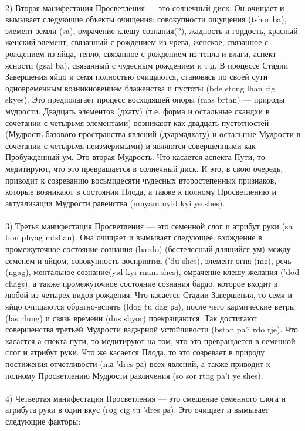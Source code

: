 \\
2) Вторая манифестация Просветления — это солнечный диск. Он очищает и вымывает
следующие объекты очищения: совокупности ощущения (tshor ba), элемент земли (sa),
омрачение-клешу сознания(?), жадность и гордость, красный женский элемент, связанный с
рождением из чрева, женское, связанное с рождением из яйца, тепло, связанное с рождением
из тепла и влаги, аспект ясности (gsal ba), связанный с чудесным рождением и т.д. В
процессе Стадии Завершения яйцо и семя полностью очищаются, становясь по своей сути
одновременным возникновением блаженства и пустоты (bde stong lhan cig skyes). Это
предполагает процесс восходящей опоры (mas brtan) — природы мудрости. Двадцать
элементов (дхату) (т.е. форма и остальные скандхи в сочетании с четырьмя элементами)
возникают как двадцать пустотностей (Мудрость базового пространства явлений
(дхармадхату) и остальные Мудрости в сочетании с четырьмя неизмеримыми) и являются
совершенными как Пробужденный ум. Это вторая Мудрость. Что касается аспекта Пути, то
медитируют, что это превращается в солнечный диск. И это, в свою очередь, приводит к
созреванию восьмидесяти чудесных второстепенных признаков, которые возникают в
состоянии Плода, а также к полному Просветлению и актуализации Мудрости равенства
(mnyam nyid kyi ye shes).\\
\\
3) Третья манифестация Просветления — это семенной слог и атрибут руки (sa bon
phyag mtshan). Она очищает и вымывает следующее: вхождение в промежуточное состояние
сознания (bardo) (бестелесный длящийся ум) между семенем и яйцом, совокупность
восприятия ('du shes), элемент огня (mе), речь (ngag), ментальное сознание(yid kyi rnam shes),
омрачение-клешу желания ('dod chags), а также промежуточное состояние сознания бардо,
которое входит в любой из четырех видов рождения. Что касается Стадии Завершения, то
семя и яйцо очищаются обратно-вспять (ldog tu dag ра), после чего кармические ветры (las
rlung) и связь времени (dus sbyor) прекращаются. Так достигают совершенства третьей
Мудрости ваджрной устойчивости (bstan pa'i rdo rje). Что касается а спекта пути, то
медитируют на том, что это превращается в семенной слог и атрибут руки. Что же касается
Плода, то это созревает в природу постижения отчетливости (mа 'dres ра) всех явлений, а
также приводит к полному Просветлению Мудрости различения (so sor rtog  pa'i ye shes).\\
\\
4) Четвертая манифестация Просветления — это смешение семенного слога и
атрибута руки в один вкус (гоg cig tu 'dres ра). Это очищает и вымывает следующие факторы:
